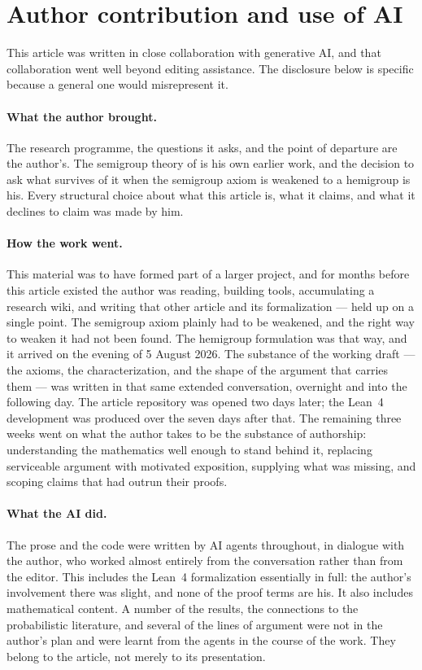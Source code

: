 \section*{Author contribution and use of AI}

This article was written in close collaboration with generative AI, and that collaboration
went well beyond editing assistance. The disclosure below is specific because a general one
would misrepresent it.

\paragraph{What the author brought.} The research programme, the questions it asks, and the
point of departure are the author's. The semigroup theory of 
is his own earlier work, and the decision to ask what survives of it when the semigroup axiom
is weakened to a hemigroup is his. Every structural choice about what this article is, what
it claims, and what it declines to claim was made by him.

\paragraph{How the work went.} This material was to have formed part of a larger project, and
for months before this article existed the author was reading, building tools, accumulating a
research wiki, and writing that other article and its formalization --- held up on a single
point. The semigroup axiom plainly had to be weakened, and the right way to weaken it had not
been found. The hemigroup formulation was that way, and it arrived on the evening of 5 August
2026. The substance of the working draft --- the axioms, the characterization, and the shape
of the argument that carries them --- was written in that same extended conversation, overnight
and into the following day. The article repository was opened two days later; the Lean~4
development was produced over the seven days after that. The remaining three weeks went on what
the author takes to be the substance of authorship: understanding the mathematics well enough
to stand behind it, replacing serviceable argument with motivated exposition, supplying what
was missing, and scoping claims that had outrun their proofs.

\paragraph{What the AI did.} The prose and the code were written by AI agents throughout, in
dialogue with the author, who worked almost entirely from the conversation rather than from
the editor. This includes the Lean~4 formalization essentially in full: the author's
involvement there was slight, and none of the proof terms are his. It also includes
mathematical content. A number of the results, the connections to the probabilistic
literature, and several of the lines of argument were not in the author's plan and were
learnt from the agents in the course of the work. They belong to the article, not merely to
its presentation.

